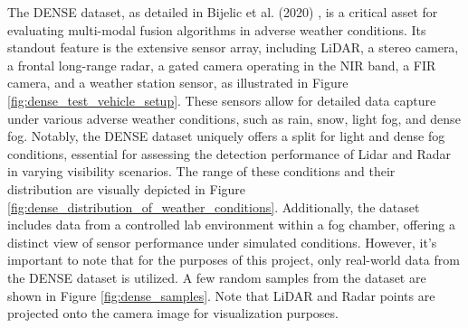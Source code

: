 \documentclass[report.tex]{subfiles}
\begin{document}
    The DENSE dataset, as detailed in Bijelic et al. (2020) \cite{bijelic2020seeing}, is a critical asset for evaluating multi-modal fusion algorithms in adverse weather conditions. Its standout feature is the extensive sensor array, including LiDAR, a stereo camera, a frontal long-range radar, a gated camera operating in the NIR band, a FIR camera, and a weather station sensor, as illustrated in Figure \ref{fig:dense_test_vehicle_setup}. These sensors allow for detailed data capture under various adverse weather conditions, such as rain, snow, light fog, and dense fog. Notably, the DENSE dataset uniquely offers a split for light and dense fog conditions, essential for assessing the detection performance of Lidar and Radar in varying visibility scenarios. The range of these conditions and their distribution are visually depicted in Figure \ref{fig:dense_distribution_of_weather_conditions}. Additionally, the dataset includes data from a controlled lab environment within a fog chamber, offering a distinct view of sensor performance under simulated conditions. However, it's important to note that for the purposes of this project, only real-world data from the DENSE dataset is utilized. A few random samples from the dataset are shown in Figure \ref{fig:dense_samples}. Note that LiDAR and Radar points are projected onto the camera image for visualization purposes.
\end{document}
